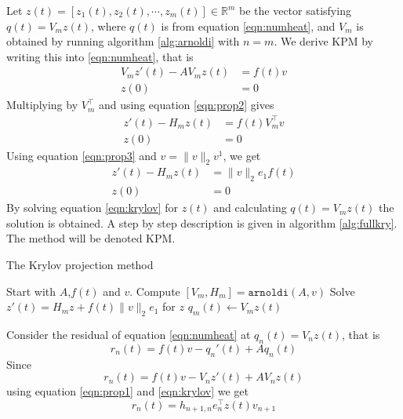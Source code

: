 Let $z(t) = [z_1(t), z_2(t), \cdots, z_m(t)] \in \mathbb{R}^m $ be the vector satisfying $q(t) = V_m z(t)$, where $q(t)$ is from equation \eqref{eqn:numheat}, and $V_m$ is obtained by running algorithm \ref{alg:arnoldi} with $n = m$. 
We derive KPM by writing this into \eqref{eqn:numheat}, that is
\begin{equation*}  \begin{aligned} \label{eqn:KPMtemp1}
V_m z'(t) - A V_m z(t) &= f(t) v \\
z(0)& = 0
\end{aligned} \end{equation*}
Multiplying by $V_m^{\top}$ and using equation \eqref{eqn:prop2} gives
\begin{equation*} 
\begin{aligned} \label{eqn:KPMtemp2}
z'(t)-H_m z(t) &= f(t) V_m^{\top}  v  \\
z(0)& = 0
\end{aligned}
\end{equation*}
Using equation \eqref{eqn:prop3} and $v = \|v \|_2 v^1 $, we get
\begin{equation} 
\begin{aligned} \label{eqn:krylov}
z'(t) -H_m z(t) &=  \|v \|_2 e_1 f(t)\\
z(0)& = 0
\end{aligned}
\end{equation}
By solving equation \eqref{eqn:krylov} for $z(t)$ and calculating $ q(t) = V_m z(t) $ the solution is obtained. A step by step description is given in algorithm \ref{alg:fullkry}. 
The method will be denoted KPM.\\
\begin{algorithm}
\begin{algorithmic} \caption{The Krylov projection method} \label{alg:fullkry} 
\STATE Start with $A$,$f(t)$ and $v$.
\STATE Compute $[V_m ,H_m] = \texttt{arnoldi}(A,v)$
\STATE Solve $  z'(t) = H_m z + f(t) \| v \|_2 e_1  $ for $z$
\STATE $ q_m (t) \leftarrow  V_m z(t) $
\end{algorithmic} 
\end{algorithm}

Consider the residual of equation \eqref{eqn:numheat} at $q_n(t) = V_n z (t)$, that is
\begin{equation*}
r_n(t) = f(t) v - q_n'(t) +Aq_n(t)
\end{equation*}
Since
\begin{equation*}
r_n(t) = f(t)v -V_n z'(t) + A V_n z(t)
\end{equation*}
using equation \eqref{eqn:prop1} and \eqref{eqn:krylov} we get
\begin{equation} \label{eqn:rn}
r_n(t) = h_{n+1,n}e_n^\top z(t) v_{n+1}
\end{equation}

